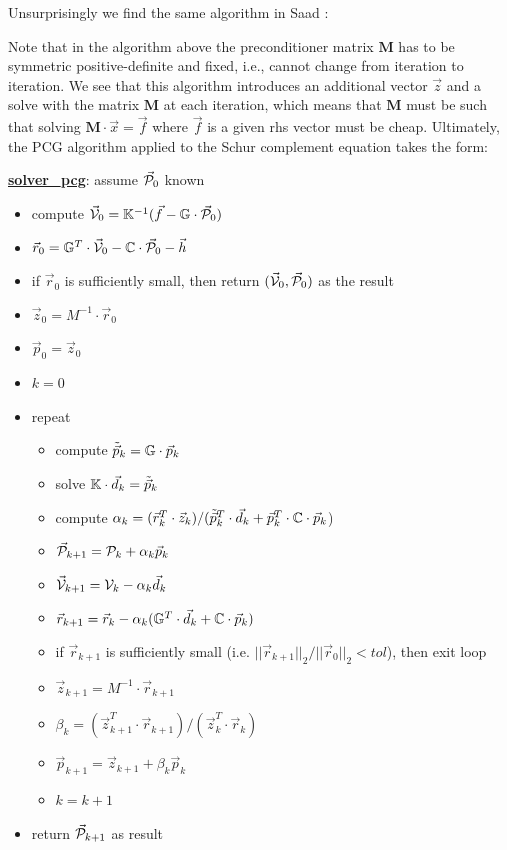 \vspace{.5cm}

Unsurprisingly we find the same algorithm in Saad \cite{saad}:


Note that in the algorithm above the preconditioner matrix ${\bm M}$ 
has to be symmetric positive-definite and fixed, i.e., cannot change from iteration to iteration. 
We see that this algorithm introduces an additional vector $\vec{z}$ and a solve with the 
matrix ${\bm M}$ at each iteration, which means that ${\bm M}$ must 
be such that solving ${\bm M}\cdot \vec{x}= \vec{f}$ 
where $\vec{f}$ is a given rhs vector must be cheap. Ultimately, the PCG algorithm applied to 
the Schur complement equation takes the form:

\begin{mdframed}[backgroundcolor=blue!5]
\underline{\bf solver\_pcg}: assume $\vec{\cal P}_0$ known
\begin{itemize}
\item compute $\vec{\cal V}_0={\mathbb{K}}^{-1}(\vec{f}-{\mathbb{G}}\cdot \vec{\cal P}_0)$
\item $\vec{r}_0 = {\mathbb{G}}^T \cdot \vec{\cal V}_0 - {\mathbb{C}} \cdot \vec{\cal P}_0 - \vec{h}$
\item if $\vec{r}_0$ is sufficiently small, then return $(\vec{\cal V}_0,\vec{\cal P}_0)$ as the result
\item $\vec{z}_0= M^{-1} \cdot \vec{r}_0$ 
\item $\vec{p}_0=\vec{z}_0$
\item $k=0$
\item repeat
\begin{itemize}
\item compute $\tilde{\vec{p}}_k = {\mathbb{G}} \cdot \vec{p}_k$
\item solve ${\mathbb{K}}\cdot  \vec{d}_k = \tilde{\vec{p}}_k$
\item compute $\alpha_k=(\vec{r}_k^T \cdot \vec{z}_k)/(\tilde{\vec{p}}_k^T \cdot \vec{d}_k
      + \vec{p}_k^T\cdot{\mathbb{C}} \cdot \vec{p}_k$)
\item $\vec{\cal P}_{k+1} = {\cal P}_k+\alpha_k \vec{p}_k$
\item $\vec{\cal V}_{k+1} = {\cal V}_k - \alpha_k \vec{d}_k$
\item $\vec{r}_{k+1} = \vec{r}_k - \alpha_k ({\mathbb{G}}^T \cdot \vec{d}_k + {\mathbb{C}} \cdot \vec{p}_k) $
\item if $\vec{r}_{k+1}$ is sufficiently small (i.e. $||\vec{r}_{k+1}||_2/||\vec{r}_0||_2 <tol$), 
      then exit loop
\item $\vec{z}_{k+1}=M^{-1} \cdot \vec{r}_{k+1}$
\item $\beta_k=(\vec{z}_{k+1}^T \cdot  \vec{r}_{k+1})/(\vec{z}_k^T \cdot  \vec{r}_k)$
\item $\vec{p}_{k+1} =\vec{z}_{k+1}+ \beta_k \vec{p}_k$
\item $k=k+1$
\end{itemize}
\item return $\vec{\cal P}_{k+1}$ as result
\end{itemize}
\end{mdframed}

